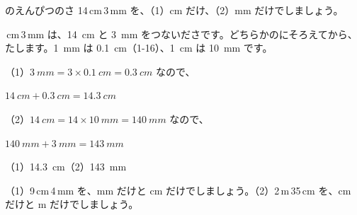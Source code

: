 \begin{reidai}[cm と mm がまざった\R{長}{なが}さ]
\leavevmode\label{bk:2-1:enpitsu}\bkyattemiyouref のえんぴつのさ 14\,cm\,3\,mm を、（1）cm だけ、（2）mm だけでしましょう。\par
{}\,cm\,3\,mm は、\qty{14}{cm} と \qty{3}{mm} をつないださです。どちらかのにそろえてから、たします。\qty{1}{mm} は \qty{0.1}{cm}（1-16）、\qty{1}{cm} は \qty{10}{mm} です。\par
\begin{bkcenter}
\end{bkcenter}
\shiki （1）$\qty{3}{mm}=3\times\qty{0.1}{cm}=\qty{0.3}{cm}$ なので、\par
\hspace*{4.6\zw}$\qty{14}{cm}+\qty{0.3}{cm}=\qty{14.3}{cm}$\par
\hspace*{2.6\zw}（2）$\qty{14}{cm}=14\times\qty{10}{mm}=\qty{140}{mm}$ なので、\par
\hspace*{4.6\zw}$\qty{140}{mm}+\qty{3}{mm}=\qty{143}{mm}$\par
\kotae （1）\qty{14.3}{cm}\quad（2）\qty{143}{mm}
\end{reidai}

\begin{jibun}
（1）9\,cm\,4\,mm を、mm だけと cm だけでしましょう。\quad（2）2\,m\,35\,cm を、cm だけと m だけでしましょう。
\end{jibun}

